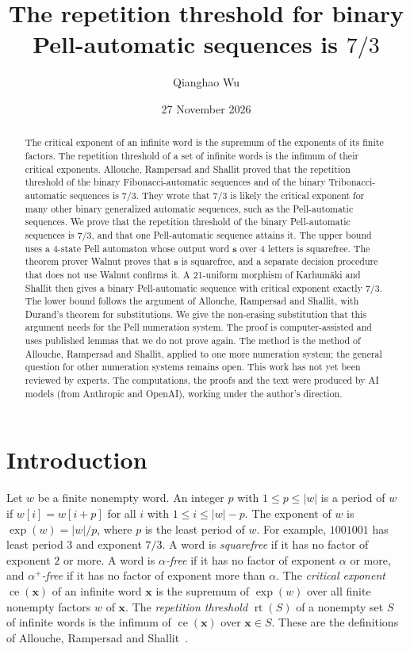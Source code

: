 \documentclass[11pt]{article}
\title{The repetition threshold for binary Pell-automatic sequences is $7/3$}
\author{Qianghao Wu}
\date{27 November 2026}
\theoremstyle{definition}
\theoremstyle{remark}
\DeclareMathOperator{\ce}{ce}
\DeclareMathOperator{\rt}{rt}
\begin{document}
\maketitle

\begin{abstract}
The critical exponent of an infinite word is the supremum of the exponents of its finite factors. The repetition threshold of a set of infinite words is the infimum of their critical exponents. Allouche, Rampersad and Shallit proved that the repetition threshold of the binary Fibonacci-automatic sequences and of the binary Tribonacci-automatic sequences is $7/3$. They wrote that $7/3$ is likely the critical exponent for many other binary generalized automatic sequences, such as the Pell-automatic sequences. We prove that the repetition threshold of the binary Pell-automatic sequences is $7/3$, and that one Pell-automatic sequence attains it. The upper bound uses a 4-state Pell automaton whose output word $\mathbf{s}$ over 4 letters is squarefree. The theorem prover Walnut proves that $\mathbf{s}$ is squarefree, and a separate decision procedure that does not use Walnut confirms it. A 21-uniform morphism of Karhum\"aki and Shallit then gives a binary Pell-automatic sequence with critical exponent exactly $7/3$. The lower bound follows the argument of Allouche, Rampersad and Shallit, with Durand's theorem for substitutions. We give the non-erasing substitution that this argument needs for the Pell numeration system. The proof is computer-assisted and uses published lemmas that we do not prove again. The method is the method of Allouche, Rampersad and Shallit, applied to one more numeration system; the general question for other numeration systems remains open. This work has not yet been reviewed by experts. The computations, the proofs and the text were produced by AI models (from Anthropic and OpenAI), working under the author's direction.
\end{abstract}

\section{Introduction}

Let $w$ be a finite nonempty word. An integer $p$ with $1 \le p \le |w|$ is a period of $w$ if $w[i] = w[i+p]$ for all $i$ with $1 \le i \le |w|-p$. The exponent of $w$ is $\exp(w) = |w|/p$, where $p$ is the least period of $w$. For example, $1001001$ has least period $3$ and exponent $7/3$. A word is \emph{squarefree} if it has no factor of exponent $2$ or more. A word is \emph{$\alpha$-free} if it has no factor of exponent $\alpha$ or more, and \emph{$\alpha^+$-free} if it has no factor of exponent more than $\alpha$. The \emph{critical exponent} $\ce(\mathbf{x})$ of an infinite word $\mathbf{x}$ is the supremum of $\exp(w)$ over all finite nonempty factors $w$ of $\mathbf{x}$. The \emph{repetition threshold} $\rt(S)$ of a nonempty set $S$ of infinite words is the infimum of $\ce(\mathbf{x})$ over $\mathbf{x} \in S$. These are the definitions of Allouche, Rampersad and Shallit~\cite{ARS}.
\end{document}
